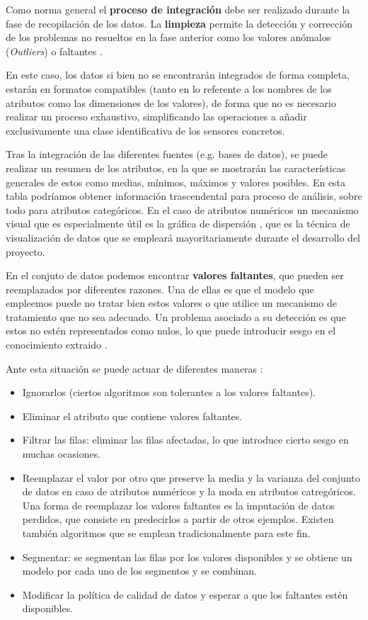 Como norma general el \textbf{proceso de integración} debe ser realizado durante la fase de recopilación de los datos.
La \textbf{limpieza} permite la detección y corrección de los problemas no resueltos en la fase anterior como los valores anómalos (\textit{Outliers}) o faltantes 
\cite{book:hernandez2004}.  

En este caso, los datos si bien no se encontrarán integrados de forma completa, estarán en formatos compatibles (tanto en lo referente
a los nombres de los atributos como las dimensiones de los valores), de forma que no es necesario
realizar un proceso exhaustivo, simplificando las operaciones a añadir exclusivamente una clase identificativa de los sensores concretos.

Tras la integración de las diferentes fuentes (e.g. bases de datos), se puede realizar un resumen de los atributos, en la que
se mostrarán las características generales de estos como medias, mínimos, máximos y valores posibles. 
En esta tabla podríamos obtener información trascendental para proceso de análisis, sobre todo para atributos categóricos.
En el caso de atributos numéricos un mecanismo visual que es especialmente útil es la gráfica de dispersión \cite{book:hernandez2004}, que es la técnica de visualización
de datos que se empleará mayoritariamente durante el desarrollo del proyecto.

En el conjuto de datos podemos encontrar \textbf{valores faltantes}, que pueden ser reemplazados por diferentes razones. Una de ellas es que
el modelo que empleemos puede no tratar bien estos valores o que utilice un mecanismo de tratamiento que no sea adecuado.
Un problema asociado a su detección es que estos no estén representados como nulos, lo que puede introducir sesgo en el conocimiento
extraido \cite{book:hernandez2004}.

Ante esta situación se puede actuar de diferentes maneras \cite{book:hernandez2004}:
\begin{itemize}
    \item Ignorarlos (ciertos algoritmos son tolerantes a los valores faltantes).
    \item Eliminar el atributo que contiene valores faltantes.
    \item Filtrar las filas: eliminar las filas afectadas, lo que introduce cierto sesgo en muchas ocasiones.
    \item Reemplazar el valor por otro que preserve la media y la varianza del conjunto de datos en caso de atributos numéricos y la moda en atributos
        catregóricos.
        Una forma de reemplazar los valores faltantes es la imputación de datos perdidos, que consiste en predecirlos a partir de otros ejemplos. Existen también
        algoritmos que se emplean tradicionalmente para este fin.
    \item Segmentar: se segmentan las filas por los valores disponibles y se obtiene un modelo por cada uno de los segmentos y se combinan.
    \item Modificar la política de calidad de datos y esperar a que los faltantes estén disponibles.
\end{itemize}

